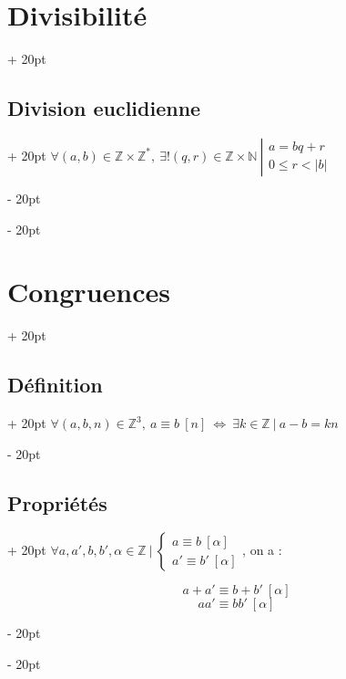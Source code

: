 \documentclass[a4paper, 12pt, twoside]{article}
\newcommand{\N}{\mathbb{N}} %
\newcommand{\Z}{\mathbb{Z}} %
\newcommand{\ssi}{\ \Leftrightarrow \ }
\newcommand{\abs}[1]{\left\lvert #1 \right\rvert} %
\newcommand{\eqsys}[2]{\begin{cases} #1 \\ #2 \end{cases}}
\renewcommand{\le}{\leqslant}
\newcommand{\ind}[1][20pt]{\advance\leftskip + #1}
\newcommand{\deind}[1][20pt]{\advance\leftskip - #1}
\newenvironment{indt}[2][20pt]{#2 \par \ind[#1]}{\par \deind} %
\begin{document}
\begin{indt}{\section{Divisibilité}}
        \vspace{6pt}
        
        \begin{indt}{\subsection{Division euclidienne}}
            $
                \forall (a, b) \in \Z \times \Z^*,\
                \exists! (q, r) \in \Z \times \N\
                \left|
                \begin{array}{l}
                    a = bq + r
                    \\
                    0 \le r < \abs b
                \end{array}
                \right.
            $
        \end{indt}
        
    \end{indt}
    
    \vspace{12pt}
    
    \begin{indt}{\section{Congruences}}
        
        \begin{indt}{\subsection{Définition}}
            $\forall (a, b, n) \in \Z^3,\ a \equiv b\ [n] \ssi \exists k \in \Z\ |\ a - b = kn$
        \end{indt}
        
        \vspace{6pt}
        
        \begin{indt}{\subsection{Propriétés}}
            $\forall a, a', b, b', \alpha \in \Z\ |\ \eqsys{a \equiv b\ [\alpha]}{a' \equiv b'\ [\alpha]}$, on a :
            
            \[ a + a' \equiv b + b'\ [\alpha] \]
            \[ aa' \equiv bb'\ [\alpha] \]
        \end{indt}
        
    \end{indt}
    
\end{document}
